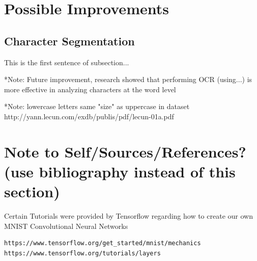 \documentclass[11pt]{article}
\begin{document}
\section{Possible Improvements}
\subsection{Character Segmentation}
This is the first sentence of subsection...




*Note: Future improvement, research showed that performing OCR (using...) is more effective in analyzing characters at the word level

*Note: lowercase letters same "size" as uppercase in dataset
http://yann.lecun.com/exdb/publis/pdf/lecun-01a.pdf



\section{Note to Self/Sources/References?(use bibliography instead of this section)}
Certain Tutorials were provided by Tensorflow regarding how to create our own MNIST Convolutional Neural Networks
\begin{verbatim}
https://www.tensorflow.org/get_started/mnist/mechanics
https://www.tensorflow.org/tutorials/layers
\end{verbatim}

\clearpage


\end{document}
